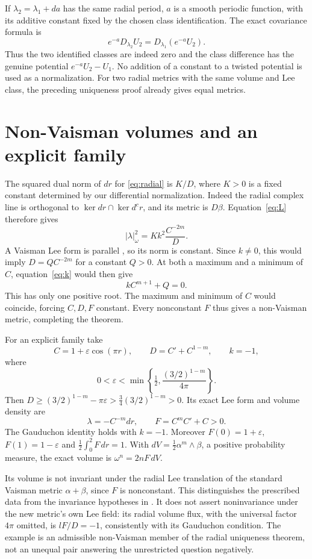 \documentclass[11pt]{article}
\theoremstyle{remark}\newtheorem{remark}[theorem]{Remark}
\begin{document}
If $\lambda_2=\lambda_1+da$ has the same radial period,
$a$ is a smooth periodic function, with its additive constant fixed
by the chosen class identification. The exact covariance formula is
\[
 e^{-a}D_{\lambda_2}U_2=D_{\lambda_1}(e^{-a}U_2).
\]
Thus the two identified classes are indeed zero and the class
difference has the genuine potential $e^{-a}U_2-U_1$.
No addition of a constant to a twisted potential is used as a
normalization. For two radial metrics with the same volume and Lee
class, the preceding uniqueness proof already gives equal metrics.

\section{Non-Vaisman volumes and an explicit family}
The squared dual norm of $dr$ for \eqref{eq:radial} is $K/D$,
where $K>0$ is a fixed constant determined by our differential
normalization. Indeed the radial complex line is orthogonal to
$\ker dr\cap\ker d^cr$, and its metric is $D\beta$.
Equation~\eqref{eq:L} therefore gives
\[
 |\lambda|_\omega^2=Kk^2\frac{C^{-2m}}{D}.
\]
A Vaisman Lee form is parallel \cite[Definition 2.3]{OV24},
so its norm is constant. Since $k\ne0$, this would imply
$D=Q C^{-2m}$ for a constant $Q>0$. At both a maximum and a
minimum of $C$, equation~\eqref{eq:k} would then give
\[
 kC^{m+1}+Q=0.
\]
This has only one positive root. The maximum and minimum of $C$
would coincide, forcing $C,D,F$ constant. Every nonconstant $F$
thus gives a non-Vaisman metric, completing the theorem.

For an explicit family take
\[
 C=1+\varepsilon\cos(\pi r),\qquad
 D=C'+C^{1-m},\qquad k=-1,
\]
where
\[
 0<\varepsilon<\min\left\{\tfrac12,
                 \frac{(3/2)^{1-m}}{4\pi}\right\}.
\]
Then $D\ge(3/2)^{1-m}-\pi\varepsilon>
\tfrac34(3/2)^{1-m}>0$. Its exact Lee form and volume density are
\[
 \lambda=-C^{-m}dr,
 \qquad F=C^mC'+C>0.
\]
The Gauduchon identity holds with $k=-1$. Moreover
$F(0)=1+\varepsilon$, $F(1)=1-\varepsilon$ and
$\frac12\int_0^2F\,dr=1$. With
$dV=\frac12\alpha^m\wedge\beta$, a positive probability measure,
the exact volume is $\omega^n=2nF\,dV$.

Its volume is not invariant under the radial Lee translation of
the standard Vaisman metric $\alpha+\beta$, since $F$ is
nonconstant. This distinguishes the prescribed data from the
invariance hypotheses in \cite[Theorem 4.1]{OV24}. It does not
assert noninvariance under the new metric's own Lee field:
its radial volume flux, with the universal factor $4\pi$ omitted,
is $lF/D=-1$, consistently with its Gauduchon condition.
The example is an admissible non-Vaisman
member of the radial uniqueness theorem, not an unequal pair
answering the unrestricted question negatively.
\end{document}
